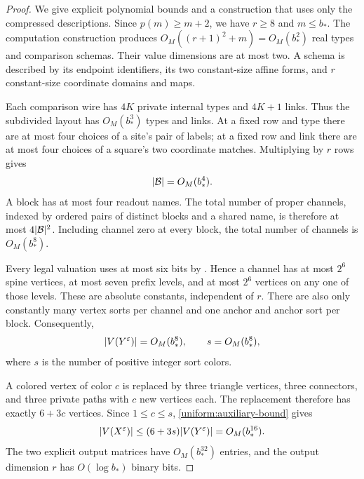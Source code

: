 \begin{proof}
We give explicit polynomial bounds and a construction that uses only the
compressed descriptions.  Since $p(m)\geq m+2$, we have $r\geq 8$ and
$m\leq b_*$.  The computation construction produces
$O_M((r+1)^2+m)=O_M(b_*^2)$ real types and comparison schemas.  Their
value dimensions are at most two.  A schema is described by its endpoint
identifiers, its two constant-size affine forms, and $r$ constant-size
coordinate domains and maps.

Each comparison wire has $4K$ private internal types and $4K+1$ links.
Thus the subdivided layout has $O_M(b_*^3)$ types and links.  At a fixed
row and type there are at most four choices of a site's pair of labels;
at a fixed row and link there are at most four choices of a square's two
coordinate matches.  Multiplying by $r$ rows gives
\begin{equation}
\label{uniform:block-bound}
 \lvert\mathcal B\rvert=O_M(b_*^4).
\end{equation}
A block has at most four readout names.  The total number of proper
channels, indexed by ordered pairs of distinct blocks and a shared name,
is therefore at most $4\lvert\mathcal B\rvert^2$.  Including channel zero at every
block, the total number of channels is $O_M(b_*^8)$.

Every legal valuation uses at most six bits by
.  Hence a channel has at most $2^6$ spine
vertices, at most seven prefix levels, and at most $2^6$ vertices on any
one of those levels.  These are absolute constants, independent of $r$.
There are also only constantly many vertex sorts per channel and one
anchor and anchor sort per block.  Consequently,
\begin{equation}
\label{uniform:auxiliary-bound}
 \lvert V(Y^\varepsilon)\rvert=O_M(b_*^8),\qquad
 s=O_M(b_*^8),
\end{equation}
where $s$ is the number of positive integer sort colors.

A colored vertex of color $c$ is replaced by three triangle vertices,
three connectors, and three private paths with $c$ new vertices each.
The replacement therefore has exactly $6+3c$ vertices.  Since
$1\leq c\leq s$, \eqref{uniform:auxiliary-bound} gives
\begin{equation}
\label{uniform:graph-bound}
 \lvert V(X^\varepsilon)\rvert
 \leq (6+3s)\lvert V(Y^\varepsilon)\rvert=O_M(b_*^{16}).
\end{equation}
The two explicit output matrices have $O_M(b_*^{32})$ entries, and the
output dimension $r$ has $O(\log b_*)$ binary bits.


\end{proof}
